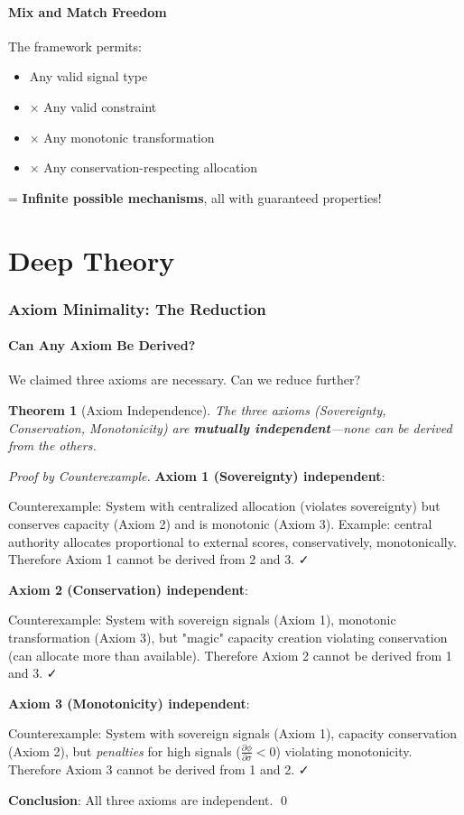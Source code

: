 \documentclass[11pt,a4paper]{article}
\newtheorem{theorem}{Theorem}[section]
\theoremstyle{definition}
\theoremstyle{remark}
\begin{document}
\subsection{Mix and Match Freedom}

The framework permits:
\begin{itemize}
\item Any valid signal type
\item × Any valid constraint
\item × Any monotonic transformation
\item × Any conservation-respecting allocation
\end{itemize}

= \textbf{Infinite possible mechanisms}, all with guaranteed properties!

\part{Deep Theory}

\section{Axiom Minimality: The Reduction}

\subsection{Can Any Axiom Be Derived?}

We claimed three axioms are necessary. Can we reduce further?

\begin{theorem}[Axiom Independence]
The three axioms (Sovereignty, Conservation, Monotonicity) are \textbf{mutually independent}—none can be derived from the others.
\end{theorem}

\begin{proof}[Proof by Counterexample]
\textbf{Axiom 1 (Sovereignty) independent}:

Counterexample: System with centralized allocation (violates sovereignty) but conserves capacity (Axiom 2) and is monotonic (Axiom 3). Example: central authority allocates proportional to external scores, conservatively, monotonically. Therefore Axiom 1 cannot be derived from 2 and 3. ✓

\textbf{Axiom 2 (Conservation) independent}:

Counterexample: System with sovereign signals (Axiom 1), monotonic transformation (Axiom 3), but "magic" capacity creation violating conservation (can allocate more than available). Therefore Axiom 2 cannot be derived from 1 and 3. ✓

\textbf{Axiom 3 (Monotonicity) independent}:

Counterexample: System with sovereign signals (Axiom 1), capacity conservation (Axiom 2), but \textit{penalties} for high signals ($\frac{\partial \phi}{\partial \sigma} < 0$) violating monotonicity. Therefore Axiom 3 cannot be derived from 1 and 2. ✓

\textbf{Conclusion}: All three axioms are independent. \qed
\end{proof}
\end{document}
